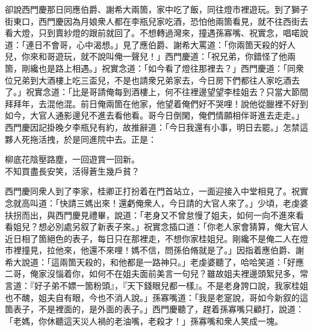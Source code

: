 卻說西門慶那日同應伯爵、謝希大兩箇，{}家中吃了飯，同往燈市裡遊玩。到了獅子街東口，西門慶因為月娘衆人都在李瓶兒家吃酒，恐怕他兩箇看見，就不往西街去看大燈，只到賣紗燈的跟前就回了。不想轉過灣來，撞遇孫寡嘴、祝實念，唱喏說道：「連日不會哥，心中渴想。」見了應伯爵、謝希大罵道：「你兩箇天殺的好人兒，你來和哥遊玩，就不說叫俺一聲兒！」西門慶道：「祝兄弟，你錯怪了他兩箇，剛纔也是路上相遇。」祝實念道：「如今看了燈往那裡去？」西門慶道：「同衆位兄弟到大酒樓上吃三盃兒，不是也請衆兄弟家去，今日房下們都往人家吃酒去了。」祝實念道：「比是哥請俺每到酒樓上，何不往裡邊望望李桂姐去？只當大節間拜拜年，去混他混。前日俺兩箇在他家，他望着俺們好不哭哩！說他從臘裡不好到如今，大官人通影邊兒不進去看他看。哥今日倒閑，俺們情願相伴哥進去走走。」西門慶因記掛晚夕李瓶兒有約，故推辭道：「今日我還有小事，明日去罷。」怎禁這夥人死拖活拽，於是同進院中去。正是：

\begin{myquote}
柳底花陰壓路塵，一回遊賞一回新。\\不知買盡長安笑，活得蒼生幾戶貧？
\end{myquote}

西門慶同衆人到了李家，桂卿正打扮着在門首站立，一面迎接入中堂相見了。祝實念就高叫道：{}「快請三媽出來！還虧俺衆人，今日請的大官人來了。」少頃，老虔婆扶拐而出，與西門慶見禮畢，說道：「老身又不曾怠慢了姐夫，如何一向不進來看看姐兒？想必別處另叙了新表子來。」祝實念插口道：「你老人家會猜算，俺大官人近日相了箇絕色的表子，每日只在那裡走，不想你家桂姐兒。剛纔不是俺二人在燈市裡撞見，拉他來，他還不來哩！媽不信，問孫伯脩就是了。」因指着應伯爵、謝希大說道：「這兩箇天殺的，和他都是一路神只。」老虔婆聽了，哈哈笑道：「好應二哥，俺家沒惱着你，如何不在姐夫面前美言一句兒？雖故姐夫裡邊頭絮兒多，常言道：『好子弟不嫖一箇粉頭』，『天下錢眼兒都一樣』。{}不是老身誇口說，我家桂姐也不醜，姐夫自有眼，今也不消人說。」孫寡嘴道：「我是老寔說，哥如今新叙的這箇表子，不是裡面的，是外面的表子。」{}西門慶聽了，趕着孫寡嘴只顧打，說道：「老媽，你休聽這天災人禍的老油嘴，老殺才！」孫寡嘴和衆人笑成一塊。

